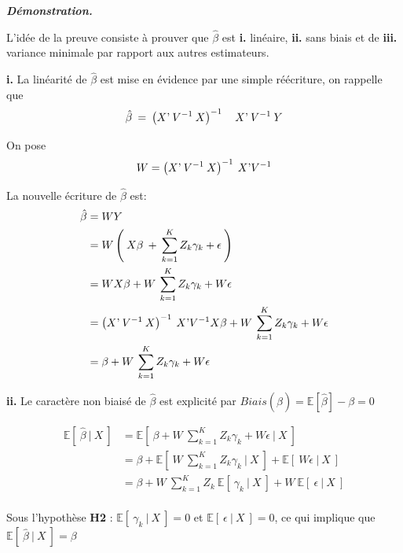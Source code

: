 \documentclass[11pt,fleqn]{book} %
\begin{document}
	\vspace{1em}
	
	\textbf{\textit{Démonstration.}}
	
	\vspace{0.5em}
	
	L'idée de la preuve consiste à prouver que $\hat{\beta}$ est \textbf{i.} linéaire, \textbf{ii.} sans biais et de \textbf{iii.} variance minimale par rapport aux autres estimateurs.
	
	\vspace{0.5em}
	
	\textbf{i.} La linéarité de $\hat{\beta}$ est mise en évidence par une simple réécriture, on rappelle que
	\[
	\hat{\beta}\:=\:\left(  X\textnormal{'}\:V^{-1} \: X \right)^{-1} \quad X\textnormal{'} \:V^{-1}\: Y
	\]
	
	On pose 
	\[
	W=\left(  X\textnormal{'}\:V^{-1} \: X \right)^{-1} \: X\textnormal{'}V^{-1}
	\]
	
	La nouvelle écriture de $\hat{\beta}$ est:
	\begin{align*}
		\hat{\beta} &= W Y\\
		&= W \left( \:X\beta\:+\:\sum_{k=1}^{K} Z_k \gamma_k + \epsilon\: \right) \\
		&= W X\beta+ W \:\sum_{k=1}^{K} Z_k \gamma_k +W\epsilon\\
		&= \left(  X\textnormal{'}\:V^{-1} \: X \right)^{-1} \: X\textnormal{'}V^{-1}X\beta + W \:\sum_{k=1}^{K} Z_k \gamma_k + W\epsilon\\
		&= \beta +  W \:\sum_{k=1}^{K} Z_k \gamma_k +W\epsilon 
	\end{align*}
	
	
	\vspace{0.5em}
	
	\textbf{ii.} Le caractère non biaisé de $\hat{\beta}$ est explicité par $Biais(\hat{\beta})=\mathbb{E}[\hat{\beta}]-\beta=0$
	
	\begin{align*}
		\mathbb{E}[\:\hat{\beta}\:|\:X \:]&=\mathbb{E}[\:\beta +  W \:\sum_{k=1}^{K} Z_k \gamma_k + W\epsilon \:|\: X\: ]\\
		&= \beta + \mathbb{E}[\:W \:\sum_{k=1}^{K} Z_k \gamma_k  \:|\: X\:] + \mathbb{E}[\: W\epsilon \:|\: X\:]\\
		&=  \beta + W\:\sum_{k=1}^{K} Z_k \:\mathbb{E}[\: \gamma_k \:|\: X\:]+ W\:\mathbb{E}[\: \epsilon \:|\: X\:]\\
	\end{align*}
	
	Sous l'hypothèse \textbf{H2} : $\mathbb{E}[\: \gamma_k \:|\: X\:]=0$ \:et\: $\mathbb{E}[\: \epsilon \:|\: X\:]=0$, ce qui implique que $\mathbb{E}[\:\hat{\beta}\:|\:X \:]=\beta$\\
	
\end{document}
